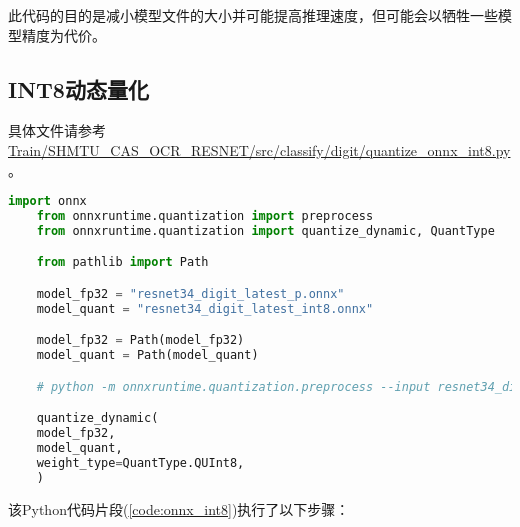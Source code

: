 此代码的目的是减小模型文件的大小并可能提高推理速度，但可能会以牺牲一些模型精度为代价。

\subsection{INT8动态量化}

具体文件请参考\url{Train/SHMTU_CAS_OCR_RESNET/src/classify/digit/quantize_onnx_int8.py}。

\begin{lstlisting}[caption={ONNX INT8量化},language=Python,label=code:onnx_int8]
	import onnx
	from onnxruntime.quantization import preprocess
	from onnxruntime.quantization import quantize_dynamic, QuantType

	from pathlib import Path

	model_fp32 = "resnet34_digit_latest_p.onnx"
	model_quant = "resnet34_digit_latest_int8.onnx"

	model_fp32 = Path(model_fp32)
	model_quant = Path(model_quant)

	# python -m onnxruntime.quantization.preprocess --input resnet34_digit_latest.onnx --output resnet34_digit_latest_p.onnx

	quantize_dynamic(
	model_fp32,
	model_quant,
	weight_type=QuantType.QUInt8,
	)

\end{lstlisting}

该Python代码片段(\ref{code:onnx_int8})执行了以下步骤：

